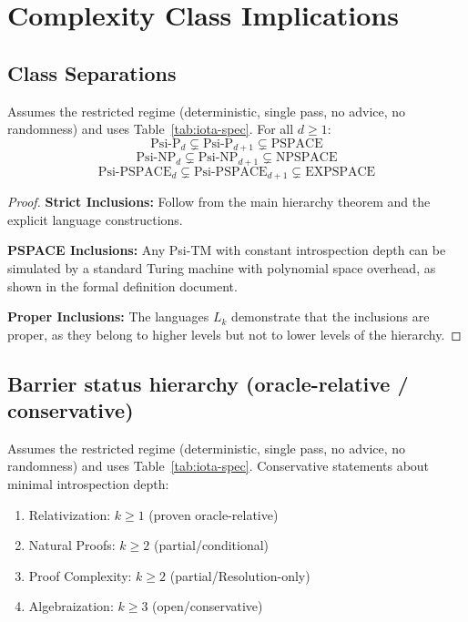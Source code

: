\section{Complexity Class Implications}

\subsection{Class Separations}

\begin{theorem}
Assumes the restricted regime (deterministic, single pass, no advice, no randomness) and uses Table~\ref{tab:iota-spec}.
For all $d \geq 1$:
$$\text{Psi-P}_d \subsetneq \text{Psi-P}_{d+1} \subsetneq \text{PSPACE}$$
$$\text{Psi-NP}_d \subsetneq \text{Psi-NP}_{d+1} \subsetneq \text{NPSPACE}$$
$$\text{Psi-PSPACE}_d \subsetneq \text{Psi-PSPACE}_{d+1} \subsetneq \text{EXPSPACE}$$
\end{theorem}

\begin{proof}
\textbf{Strict Inclusions:}
Follow from the main hierarchy theorem and the explicit language constructions.

\textbf{PSPACE Inclusions:}
Any Psi-TM with constant introspection depth can be simulated by a standard Turing machine with polynomial space overhead, as shown in the formal definition document.

\textbf{Proper Inclusions:}
The languages $L_k$ demonstrate that the inclusions are proper, as they belong to higher levels but not to lower levels of the hierarchy.
\end{proof}

\subsection{Barrier status hierarchy (oracle-relative / conservative)}

\begin{theorem}
Assumes the restricted regime (deterministic, single pass, no advice, no randomness) and uses Table~\ref{tab:iota-spec}.
Conservative statements about minimal introspection depth:
\begin{enumerate}
\item Relativization: $k \geq 1$ (proven oracle-relative)
\item Natural Proofs: $k \geq 2$ (partial/conditional)
\item Proof Complexity: $k \geq 2$ (partial/Resolution-only)
\item Algebraization: $k \geq 3$ (open/conservative)
\end{enumerate}
\end{theorem}

